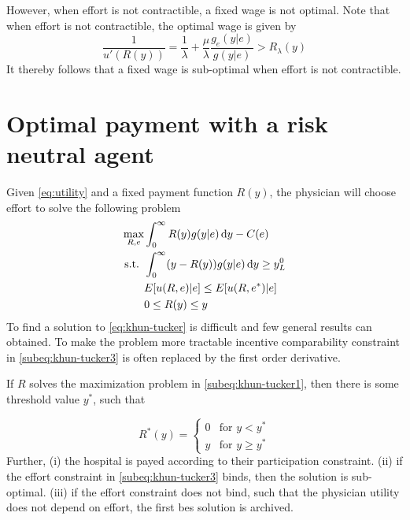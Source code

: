 However, when effort is not contractible, a fixed wage is not optimal. Note that when effort is not contractible, the optimal wage is given by 
\[
    \frac{1}{u'(R(y))}=\frac{1}{\lambda}+\frac{\mu}{\lambda}\frac{g_e(y|e)}{g(y|e)}>R_\lambda(y)
\]
It thereby follows that a fixed wage is sub-optimal when effort is not contractible.


\section{Optimal payment with a risk neutral agent} %
\label{sec:optimal_payment_with_a_risk_neutral_agent}




Given \cref{eq:utility} and a fixed payment function $R(y)$, the physician will choose effort to solve the following problem
\begin{subequations}
\label{eq:khun-tucker}
\begin{align}
    \max_{R,e} & \int_0^{\infty}R(y)g(y|e)\dif y-C(e)\label{subeq:khun-tucker1} \\
    \text{s.t. }    & \int_{0}^{\infty} (y-R(y))g(y|e)\dif y\geq y_L^0 \label{subeq:khun-tucker2} \\
                    & E[u(R,e)|e]\leq E[u(R,e^*)|e] \label{subeq:khun-tucker3}\\
                    & 0\leq R(y)\leq y \label{subeq:khun-tucker4}
\end{align}
\end{subequations}
To find a solution to \cref{eq:khun-tucker} is difficult and few general results can obtained. To make the problem more tractable incentive comparability constraint in \cref{subeq:khun-tucker3} is often replaced by the first order derivative. 

\begin{proposition}
\label{prop:payment-function}
If $R$ solves the maximization problem in \cref{subeq:khun-tucker1}, then there is some threshold value $y^*$, such that 

\[
    R^*(y)=\begin{cases}
                0 & \text{for } y< y^* \\
                y & \text{for } y\geq y^*
            \end{cases}            
\]
Further,  (i) the hospital is payed according to their participation constraint. (ii)  if the effort constraint in \cref{subeq:khun-tucker3} binds, then the solution is sub-optimal. (iii)  if the effort constraint does not bind, such that the physician utility does not depend on effort, the first bes solution is archived. 
\end{proposition}

